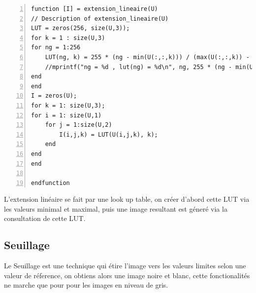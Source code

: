\documentclass[12pt, letterpaper]{article}
\begin{document}
\begin{Verbatim}[numbers=left,xleftmargin = 5mm]
function [I] = extension_lineaire(U)
// Description of extension_lineaire(U)
LUT = zeros(256, size(U,3));
for k = 1 : size(U,3)
for ng = 1:256
    LUT(ng, k) = 255 * (ng - min(U(:,:,k))) / (max(U(:,:,k)) - min(U(:,:,k)));
    //mprintf("ng = %d , lut(ng) = %d\n", ng, 255 * (ng - min(U(:,:,k))) / (max(U(:,:,k)) - min(U(:,:,k))));
end
end
I = zeros(U);
for k = 1: size(U,3);
for i = 1: size(U,1)
    for j = 1:size(U,2)
        I(i,j,k) = LUT(U(i,j,k), k);
    end
end
end

endfunction
\end{Verbatim}
L'extension linéaire se fait par une look up table, on créer d'abord cette LUT via les valeurs minimal et maximal,
puis une image resultant est géneré via la consultation de cette LUT.

\subsection{Seuillage}
Le Seuillage est une technique qui étire l'image vers les valeurs limites selon une valeur de réference, on obtiens alors une image noire et blanc,
cette fonctionalités ne marche que pour pour les images en niveau de gris.
\end{document}
